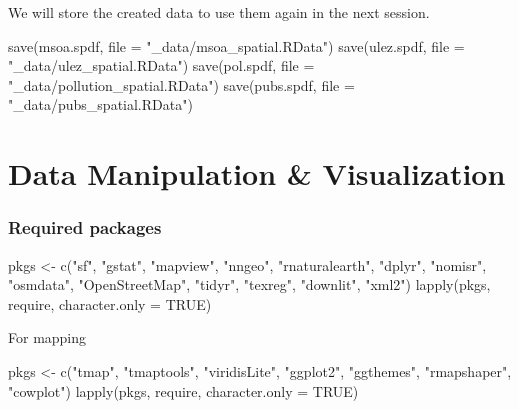 \documentclass[
  letterpaper,
]{scrbook}
\newenvironment{Shaded}{\begin{snugshade}}{\end{snugshade}}
\newcommand{\AttributeTok}[1]{\textcolor[rgb]{0.40,0.45,0.13}{#1}}
\newcommand{\ConstantTok}[1]{\textcolor[rgb]{0.56,0.35,0.01}{#1}}
\newcommand{\FunctionTok}[1]{\textcolor[rgb]{0.28,0.35,0.67}{#1}}
\newcommand{\NormalTok}[1]{\textcolor[rgb]{0.00,0.23,0.31}{#1}}
\newcommand{\OtherTok}[1]{\textcolor[rgb]{0.00,0.23,0.31}{#1}}
\newcommand{\StringTok}[1]{\textcolor[rgb]{0.13,0.47,0.30}{#1}}
\begin{document}
We will store the created data to use them again in the next session.

\begin{Shaded}
\begin{Highlighting}[]
\FunctionTok{save}\NormalTok{(msoa.spdf, }\AttributeTok{file =} \StringTok{"\_data/msoa\_spatial.RData"}\NormalTok{)}
\FunctionTok{save}\NormalTok{(ulez.spdf, }\AttributeTok{file =} \StringTok{"\_data/ulez\_spatial.RData"}\NormalTok{)}
\FunctionTok{save}\NormalTok{(pol.spdf, }\AttributeTok{file =} \StringTok{"\_data/pollution\_spatial.RData"}\NormalTok{)}
\FunctionTok{save}\NormalTok{(pubs.spdf, }\AttributeTok{file =} \StringTok{"\_data/pubs\_spatial.RData"}\NormalTok{)}
\end{Highlighting}
\end{Shaded}


\hypertarget{data-manipulation-visualization}{%
\chapter{Data Manipulation \&
Visualization}\label{data-manipulation-visualization}}

\hypertarget{required-packages-1}{%
\subsection*{Required packages}\label{required-packages-1}}

\begin{Shaded}
\begin{Highlighting}[]
\NormalTok{pkgs }\OtherTok{\textless{}{-}} \FunctionTok{c}\NormalTok{(}\StringTok{"sf"}\NormalTok{, }\StringTok{"gstat"}\NormalTok{, }\StringTok{"mapview"}\NormalTok{, }\StringTok{"nngeo"}\NormalTok{, }\StringTok{"rnaturalearth"}\NormalTok{, }\StringTok{"dplyr"}\NormalTok{,}
          \StringTok{"nomisr"}\NormalTok{, }\StringTok{"osmdata"}\NormalTok{, }\StringTok{"OpenStreetMap"}\NormalTok{, }\StringTok{"tidyr"}\NormalTok{, }\StringTok{"texreg"}\NormalTok{, }\StringTok{"downlit"}\NormalTok{, }\StringTok{"xml2"}\NormalTok{) }
\FunctionTok{lapply}\NormalTok{(pkgs, require, }\AttributeTok{character.only =} \ConstantTok{TRUE}\NormalTok{)}
\end{Highlighting}
\end{Shaded}

For mapping

\begin{Shaded}
\begin{Highlighting}[]
\NormalTok{pkgs }\OtherTok{\textless{}{-}} \FunctionTok{c}\NormalTok{(}\StringTok{"tmap"}\NormalTok{, }\StringTok{"tmaptools"}\NormalTok{, }\StringTok{"viridisLite"}\NormalTok{, }
          \StringTok{"ggplot2"}\NormalTok{, }\StringTok{"ggthemes"}\NormalTok{, }\StringTok{"rmapshaper"}\NormalTok{, }\StringTok{"cowplot"}\NormalTok{) }
\FunctionTok{lapply}\NormalTok{(pkgs, require, }\AttributeTok{character.only =} \ConstantTok{TRUE}\NormalTok{)}
\end{Highlighting}
\end{Shaded}
\end{document}
